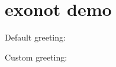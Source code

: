\documentclass{article}
\begin{document}
\section*{exonot demo}

Default greeting: \hello

Custom greeting: 
\end{document}
